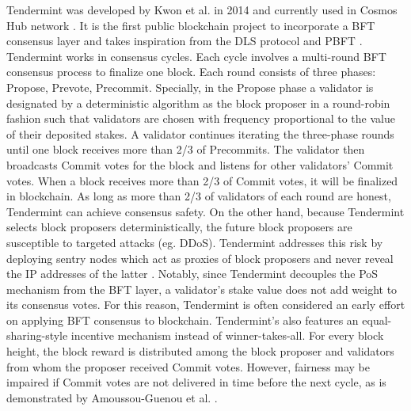 Tendermint was developed by Kwon et al.  in 2014 and currently used in Cosmos Hub network . It is the first public blockchain project to incorporate a BFT consensus layer and takes inspiration from the DLS protocol  and PBFT .
Tendermint works in consensus cycles. Each cycle involves a multi-round BFT consensus process to finalize one block. Each round consists of three phases: Propose, Prevote, Precommit. Specially, in the Propose phase a validator is designated by a deterministic algorithm as the block proposer in a round-robin fashion such that validators are chosen with frequency proportional to the value of their deposited stakes. A validator continues iterating the three-phase rounds until one block receives more than 2/3 of Precommits. The validator then broadcasts Commit votes for the block and listens for other validators' Commit votes. When a block receives more than 2/3 of Commit votes, it will be finalized in blockchain. As long as more than 2/3 of validators of each round are honest, Tendermint can achieve consensus safety. On the other hand, because Tendermint selects block proposers deterministically, the future block proposers are susceptible to targeted attacks (eg. DDoS). Tendermint addresses this risk by deploying sentry nodes which act as proxies of block proposers and never reveal the IP addresses of the latter .
{\color{\rcolor}
Notably, since Tendermint decouples the PoS mechanism from the BFT layer, a validator's stake value does not add weight to its consensus votes. For this reason, Tendermint is often considered an early effort on applying BFT consensus to blockchain.
Tendermint's also features an equal-sharing-style incentive mechanism instead of winner-takes-all. For every block height, the block reward is distributed among the block proposer and validators from whom the proposer received Commit votes. However, fairness may be impaired if Commit votes are not delivered in time before the next cycle, as is demonstrated by Amoussou-Guenou et al. . 
}

